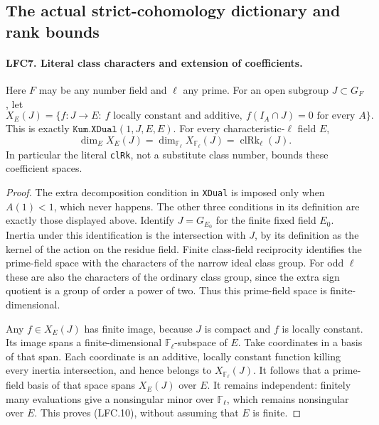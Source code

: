 \subsection{The actual strict-cohomology dictionary and rank bounds}

\paragraph{LFC7. Literal class characters and extension of coefficients.}
\label{claim:LFC7}
Here \(F\) may be any number field and \(\ell\) any prime.
For an open subgroup \(J\subset G_F\), let
\[
 X_E(J)=\{f:J\to E:\ f\text{ locally constant and additive},
                   \ f(I_A\cap J)=0\text{ for every }A\}.
 \]
This is exactly \(\texttt{Kum.XDual}(1,J,E,E)\).
For every characteristic-\(\ell\) field \(E\),
\[
 \dim_E X_E(J)=\dim_{\mathbb F_\ell}X_{\mathbb F_\ell}(J)
                  =\operatorname{clRk}_\ell(J).           \tag{LFC.10}
\]
In particular the literal \texttt{clRk}, not a substitute
class number, bounds these coefficient spaces.

\begin{proof}
The extra decomposition condition in \texttt{XDual} is
imposed only when \(A(1)<1\), which never happens.
The other three conditions in its definition are exactly
those displayed above.  Identify \(J=G_{E_0}\) for the finite
fixed field \(E_0\).  Inertia under this identification is
the intersection with \(J\), by its definition as the
kernel of the action on the residue field.
Finite class-field reciprocity identifies the prime-field
space with the characters of the narrow ideal class group.
For odd \(\ell\) these are also the characters of the
ordinary class group, since the extra sign quotient is
a group of order a power of two.
Thus this prime-field space is finite-dimensional.

Any \(f\in X_E(J)\) has finite image, because \(J\) is
compact and \(f\) is locally constant.  Its image spans a
finite-dimensional \(\mathbb F_\ell\)-subspace of \(E\).
Take coordinates in a basis of that span.  Each coordinate
is an additive, locally constant function killing every
inertia intersection, and hence belongs to
\(X_{\mathbb F_\ell}(J)\).
It follows that a prime-field basis of that space spans
\(X_E(J)\) over \(E\).  It remains independent: finitely
many evaluations give a nonsingular minor over
\(\mathbb F_\ell\), which remains nonsingular over \(E\).
This proves (LFC.10), without assuming that \(E\) is finite.
\end{proof}

